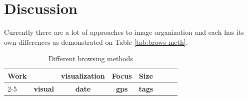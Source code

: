 
\section{Discussion} %
\label{sub:discussion}


Currently there are a lot of approaches to image organization and each has its own differences as demonstrated on Table \ref{tab:brows-meth}.

\begin{table}[ht]
\caption{Different browsing methods}
 \begin{tabular}{|l|>{\centering}p{2.6cm}|c|c|c|>{\centering}p{2.1cm}|>{\centering}p{2.8cm}|r|}
  \hline
\multirow{2}{*}{\textbf{Work}} & \multicolumn{4}{c|}{\textbf{Organization}} & \multirow{2}{*}{\textbf{visualization}} & \multirow{2}{*}{\textbf{Focus}} & \multirow{2}{*}{\textbf{Size}} \\
\cline{2-5}
	& \textbf{visual} & \textbf{date} & \textbf{gps} & \textbf{tags} & & & \\


\end{tabular}
\end{table}
